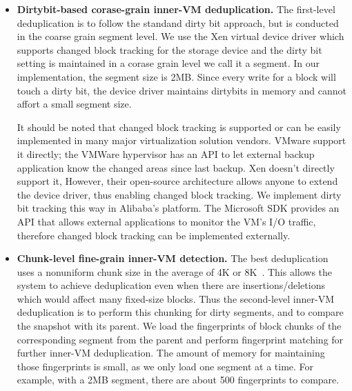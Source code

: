 \begin{itemize}
\item \textbf{Dirtybit-based corase-grain inner-VM deduplication.}
The first-level deduplication is to follow the standand dirty bit approach, but is conducted
in the coarse grain segment level.
We use the  Xen virtual device driver which supports changed block tracking
for the storage device
and the dirty bit setting is maintained in a corase grain level we call it a segment.
In our implementation, the segment size is 2MB. 
Since every write for a block will touch a dirty bit, the device driver maintains dirtybits in memory
and cannot affort a small segment  size.

It should be noted that changed block tracking is supported or can be easily implemented in many 
major virtualization solution vendors. 
VMware support it directly; the VMWare hypervisor has an API to let external backup application know 
the changed areas since last backup. Xen doesn't directly support it, However, their open-source 
architecture allows anyone to extend the device driver, thus enabling changed block tracking. 
We implement dirty bit tracking this way in Alibaba's platform.  
The Microsoft SDK provides an API that allows external applications to monitor 
the VM's I/O traffic, therefore changed block tracking can be implemented externally. 

\item \textbf{Chunk-level fine-grain inner-VM detection.}
The best deduplication uses a nonuniform chunk size 
in the average of 4K or 8K~\cite{??}. This allows the system to
achieve deduplication even when there are insertions/deletions which would
affect many fixed-size blocks.
Thus the second-level inner-VM deduplication is to perform this chunking for
dirty segments, and to compare the snapshot with its parent. 
We load the fingerprints of block chunks of the corresponding segment from the
parent and perform fingerprint matching for further inner-VM deduplication.
The amount of memory for maintaining those fingerprints  is small, as we only
load one segment at a time.
For example, with a 2MB segment, there are about 500 fingerprints to compare.


%


\end{itemize}
